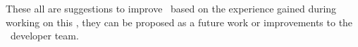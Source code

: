These all are suggestions to improve \jbmps\ based on the experience gained during working on this \MT, they can be proposed as a future work or improvements 
to the \jbmps\ developer team.






